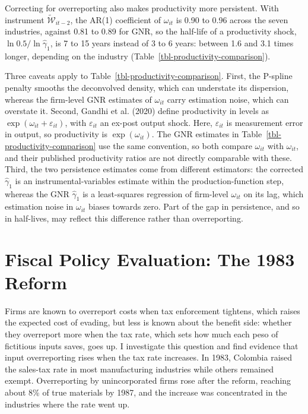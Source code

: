 \documentclass[
  12pt,
  letterpaper,
  oneside,
  openany]{report}
\begin{document}
Correcting for overreporting also makes productivity more persistent.
With instrument \(\tilde{\mathcal W}_{it-2}\), the AR(1) coefficient of
\(\omega_{it}\) is 0.90 to 0.96 across the seven industries, against
0.81 to 0.89 for GNR, so the half-life of a productivity shock,
\(\ln 0.5/\ln\hat\gamma_1\), is 7 to 15 years instead of 3 to 6 years:
between 1.6 and 3.1 times longer, depending on the industry
(Table~\ref{tbl-productivity-comparison}).

Three caveats apply to Table~\ref{tbl-productivity-comparison}. First,
the P-spline penalty smooths the deconvolved density, which can
understate its dispersion, whereas the firm-level GNR estimates of
\(\omega_{it}\) carry estimation noise, which can overstate it. Second,
Gandhi et al. (2020) define productivity in levels as
\(\exp(\omega_{it}+\varepsilon_{it})\), with \(\varepsilon_{it}\) an
ex-post output shock. Here, \(\varepsilon_{it}\) is measurement error in
output, so productivity is \(\exp(\omega_{it})\). The GNR estimates in
Table~\ref{tbl-productivity-comparison} use the same convention, so both
compare \(\omega_{it}\) with \(\omega_{it}\), and their published
productivity ratios are not directly comparable with these. Third, the
two persistence estimates come from different estimators: the corrected
\(\hat\gamma_1\) is an instrumental-variables estimate within the
production-function step, whereas the GNR \(\hat\gamma_1\) is a
least-squares regression of firm-level \(\omega_{it}\) on its lag, which
estimation noise in \(\omega_{it}\) biases towards zero. Part of the gap
in persistence, and so in half-lives, may reflect this difference rather
than overreporting.


\chapter{Fiscal Policy Evaluation: The 1983 Reform}\label{sec-fiscal}

Firms are known to overreport costs when tax enforcement tightens, which
raises the expected cost of evading, but less is known about the benefit
side: whether they overreport more when the tax rate, which sets how
much each peso of fictitious inputs saves, goes up. I investigate this
question and find evidence that input overreporting rises when the tax
rate increases. In 1983, Colombia raised the sales-tax rate in most
manufacturing industries while others remained exempt. Overreporting by
unincorporated firms rose after the reform, reaching about 8\% of true
materials by 1987, and the increase was concentrated in the industries
where the rate went up.
\end{document}

